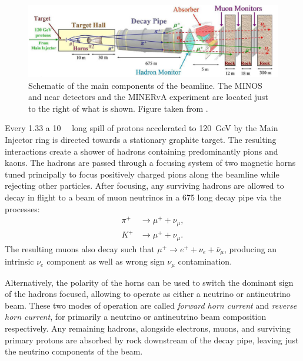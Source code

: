 \begin{figure} %
    \includegraphics[width=\textwidth]{diagrams/4-chips/numi_beam.pdf}
    \caption[Schematic of the main components of the \numi beamline]
    {Schematic of the main components of the \numi beamline. The MINOS and \nova near detectors
        and the MINERvA experiment are located just to the right of what is shown. Figure taken
        from .}
    \label{fig:numi_beam}
\end{figure}

Every \SI{1.33}{} a \SI{10}{\micro{}} long spill of protons accelerated to
\SI{120}{\GeV} by the Main Injector ring is directed towards a stationary graphite target. The
resulting interactions create a shower of hadrons containing predominantly pions and kaons. The
hadrons are passed through a focusing system of two magnetic horns tuned principally to focus
positively charged pions along the beamline while rejecting other particles. After focusing, any
surviving hadrons are allowed to decay in flight to a beam of muon neutrinos in a
\SI{675}{} long decay pipe via the processes:
\begin{align} %
    \pi^{+} & \rightarrow\mu^{+}+\nu_{\mu}, \label{eq:pi_decays}   \\
    K^{+}   & \rightarrow\mu^{+}+\nu_{\mu}. \label{eq:kaon_decays}
\end{align}
The resulting muons also decay such that $\mu^{+}\rightarrow e^{+}+\nu_{e}+\bar{\nu}_{\mu}$,
producing an intrinsic $\nu_{e}$ component as well as wrong sign $\nu_{\mu}$ contamination.

Alternatively, the polarity of the horns can be used to switch the dominant sign of the hadrons
focused, allowing \numi to operate as either a neutrino or antineutrino beam. These two modes of
operation are called \emph{forward horn current} and \emph{reverse horn current}, for primarily a
neutrino or antineutrino beam composition respectively. Any remaining hadrons, alongside
electrons, muons, and surviving primary protons are absorbed by rock downstream of the decay pipe,
leaving just the neutrino components of the beam.

